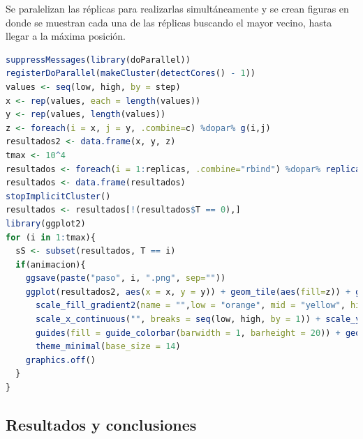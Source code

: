 \documentclass{article}
\begin{document}
\newpage

Se paralelizan las r\'eplicas para realizarlas simult\'aneamente y se crean figuras en donde se muestran cada una de las r\'eplicas buscando el mayor vecino, hasta llegar a la m\'axima posici\'on.

\begin{lstlisting}[language=R]
suppressMessages(library(doParallel))
registerDoParallel(makeCluster(detectCores() - 1))
values <- seq(low, high, by = step)
x <- rep(values, each = length(values))
y <- rep(values, length(values))
z <- foreach(i = x, j = y, .combine=c) %dopar% g(i,j)
resultados2 <- data.frame(x, y, z)
tmax <- 10^4
resultados <- foreach(i = 1:replicas, .combine="rbind") %dopar% replica(tmax, coordenadas)
resultados <- data.frame(resultados)
stopImplicitCluster()
resultados <- resultados[!(resultados$T == 0),]
library(ggplot2)
for (i in 1:tmax){
  sS <- subset(resultados, T == i)
  if(animacion){
    ggsave(paste("paso", i, ".png", sep=""))
    ggplot(resultados2, aes(x = x, y = y)) + geom_tile(aes(fill=z)) + ggtitle(paste("Paso ", i, sep="")) +
      scale_fill_gradient2(name = "",low = "orange", mid = "yellow", high = "red", midpoint=(min(z)+max(z))/2, breaks = c(seq(floor(min(z)), 0, by = 0.5))) +
      scale_x_continuous("", breaks = seq(low, high, by = 1)) + scale_y_continuous("", breaks = seq(low, high, by = 1)) +
      guides(fill = guide_colorbar(barwidth = 1, barheight = 20)) + geom_point(data = sS, aes(x= X, y= Y, color = as.factor(R)), size = 4, shape = 17, stroke = 2) + scale_color_hue(l=80, c=150, guide = FALSE) +
      theme_minimal(base_size = 14)
    graphics.off()
  }
}
\end{lstlisting}

\subsection{Resultados y conclusiones}
\end{document}

